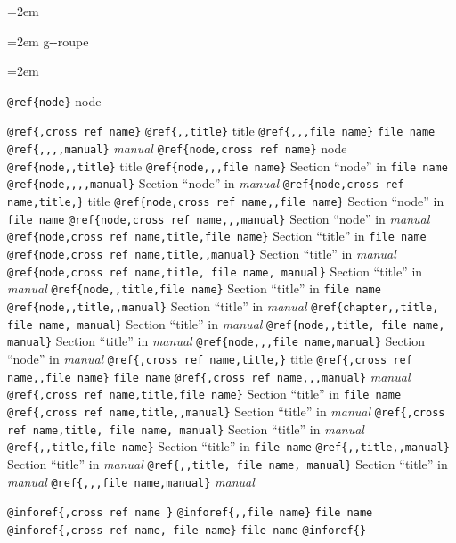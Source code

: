 \documentclass{book}
\newenvironment{GNUTexinfopreformatted}{%
  \par\begingroup\obeylines\obeyspaces\frenchspacing}{\endgroup}
\begin{document}
\begin{GNUTexinfopreformatted}
\leftskip=2em \parskip=0pt \parindent=0pt \ttfamily%

\end{GNUTexinfopreformatted}
\begin{GNUTexinfopreformatted}
\leftskip=2em \parskip=0pt \parindent=0pt \ttfamily%
g{-}{-}roupe
\end{GNUTexinfopreformatted}
\begin{GNUTexinfopreformatted}
\leftskip=2em \parskip=0pt \parindent=0pt \ttfamily%

\texttt{@ref\{node\}} node

\texttt{@ref\{,cross ref name\}} 
\texttt{@ref\{,,title\}} title
\texttt{@ref\{,,,file name\}} \texttt{file name}
\texttt{@ref\{,,,,manual\}} \textsl{manual}
\texttt{@ref\{node,cross ref name\}} node
\texttt{@ref\{node,,title\}} title
\texttt{@ref\{node,,,file name\}} Section ``node'' in \texttt{file name}
\texttt{@ref\{node,,,,manual\}} Section ``node'' in \textsl{manual}
\texttt{@ref\{node,cross ref name,title,\}} title
\texttt{@ref\{node,cross ref name,,file name\}} Section ``node'' in \texttt{file name}
\texttt{@ref\{node,cross ref name,,,manual\}} Section ``node'' in \textsl{manual}
\texttt{@ref\{node,cross ref name,title,file name\}} Section ``title'' in \texttt{file name}
\texttt{@ref\{node,cross ref name,title,,manual\}} Section ``title'' in \textsl{manual}
\texttt{@ref\{node,cross ref name,title, file name, manual\}} Section ``title'' in \textsl{manual}
\texttt{@ref\{node,,title,file name\}} Section ``title'' in \texttt{file name}
\texttt{@ref\{node,,title,,manual\}} Section ``title'' in \textsl{manual}
\texttt{@ref\{chapter,,title, file name, manual\}} Section ``title'' in \textsl{manual}
\texttt{@ref\{node,,title, file name, manual\}} Section ``title'' in \textsl{manual}
\texttt{@ref\{node,,,file name,manual\}} Section ``node'' in \textsl{manual}
\texttt{@ref\{,cross ref name,title,\}} title
\texttt{@ref\{,cross ref name,,file name\}} \texttt{file name}
\texttt{@ref\{,cross ref name,,,manual\}} \textsl{manual}
\texttt{@ref\{,cross ref name,title,file name\}} Section ``title'' in \texttt{file name}
\texttt{@ref\{,cross ref name,title,,manual\}} Section ``title'' in \textsl{manual}
\texttt{@ref\{,cross ref name,title, file name, manual\}} Section ``title'' in \textsl{manual}
\texttt{@ref\{,,title,file name\}} Section ``title'' in \texttt{file name}
\texttt{@ref\{,,title,,manual\}} Section ``title'' in \textsl{manual}
\texttt{@ref\{,,title, file name, manual\}} Section ``title'' in \textsl{manual}
\texttt{@ref\{,,,file name,manual\}} \textsl{manual}

\texttt{@inforef\{,cross ref name \}} 
\texttt{@inforef\{,,file name\}} \texttt{file name}
\texttt{@inforef\{,cross ref name, file name\}} \texttt{file name}
\texttt{@inforef\{\}} 


\end{GNUTexinfopreformatted}
\end{document}
